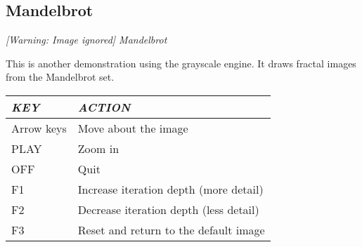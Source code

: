 \subsection{Mandelbrot}
{\centering\itshape
  [Warning: Image ignored] %
 \newline
Mandelbrot
\par}

This is another demonstration using the grayscale engine.  It draws fractal images from the Mandelbrot set.

\begin{center}\begin{tabular}{|p{2.726cm}|p{7.884cm}|}
\hline
{\centering\bfseries\itshape
KEY
\par}
&
{\centering\bfseries\itshape
ACTION
\par}
\\\hline
{\centering
Arrow keys
\par}
&
Move about the image
\\\hline
{\centering
PLAY
\par}
&
Zoom in
\\\hline
{\centering
OFF
\par}
&
Quit
\\\hline
{\centering
F1
\par}
&
Increase iteration depth (more detail)
\\\hline
{\centering
F2
\par}
&
Decrease iteration depth (less detail)
\\\hline
{\centering
F3
\par}
&
Reset and return to the default image
\\\hline
\end{tabular}\end{center}

